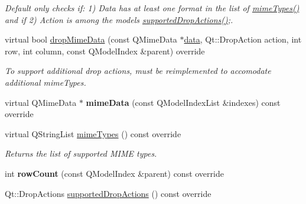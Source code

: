 \begin{DoxyCompactItemize}
\begin{DoxyCompactList}\small\item\em Default only checks if\+: 1) Data has at least one format in the list of \mbox{\hyperlink{classrev_1_1_view_1_1_blueprint_model_ac1d772e7fc75497096333c3212758d99}{mime\+Types()}} and if 2) Action is among the model\textquotesingle{}s \mbox{\hyperlink{classrev_1_1_view_1_1_blueprint_model_afac50a7db5c57c7d8debf551f07dc21c}{supported\+Drop\+Actions()}};. \end{DoxyCompactList}\item 
virtual bool \mbox{\hyperlink{classrev_1_1_view_1_1_blueprint_model_ad000f8fdde3c606931a0121f6c5647d2}{drop\+Mime\+Data}} (const Q\+Mime\+Data $\ast$\mbox{\hyperlink{classrev_1_1_view_1_1_blueprint_model_a1a01840c5de031672e9615e92e0c90cb}{data}}, Qt\+::\+Drop\+Action action, int row, int column, const Q\+Model\+Index \&parent) override
\begin{DoxyCompactList}\small\item\em To support additional drop actions, must be reimplemented to accomodate additional mime\+Types. \end{DoxyCompactList}\item 
\mbox{\label{classrev_1_1_view_1_1_blueprint_model_ad73c20ba9e9b63b49622bcc5552e71cd}} 
virtual Q\+Mime\+Data $\ast$ {\bfseries mime\+Data} (const Q\+Model\+Index\+List \&indexes) const override
\item 
virtual Q\+String\+List \mbox{\hyperlink{classrev_1_1_view_1_1_blueprint_model_ac1d772e7fc75497096333c3212758d99}{mime\+Types}} () const override
\begin{DoxyCompactList}\small\item\em Returns the list of supported M\+I\+ME types. \end{DoxyCompactList}\item 
\mbox{\label{classrev_1_1_view_1_1_blueprint_model_a1a7409f26a608ec66bd4e325f007ff9f}} 
int {\bfseries row\+Count} (const Q\+Model\+Index \&parent) const override
\item 
\mbox{\label{classrev_1_1_view_1_1_blueprint_model_afac50a7db5c57c7d8debf551f07dc21c}} 
Qt\+::\+Drop\+Actions \mbox{\hyperlink{classrev_1_1_view_1_1_blueprint_model_afac50a7db5c57c7d8debf551f07dc21c}{supported\+Drop\+Actions}} () const override

\end{DoxyCompactItemize}
